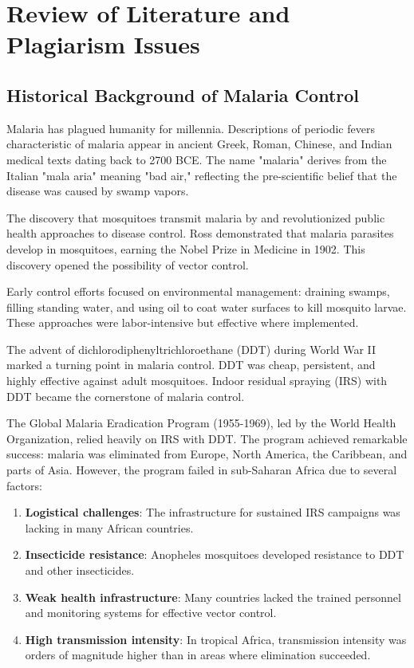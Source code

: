 \chapter{Review of Literature and Plagiarism Issues}

\section{Historical Background of Malaria Control}

Malaria has plagued humanity for millennia. Descriptions of periodic fevers characteristic of malaria appear in ancient Greek, Roman, Chinese, and Indian medical texts dating back to 2700 BCE. The name "malaria" derives from the Italian "mala aria" meaning "bad air," reflecting the pre-scientific belief that the disease was caused by swamp vapors.

The discovery that mosquitoes transmit malaria by \citet{ross1898} and \citet{grassi1900} revolutionized public health approaches to disease control. Ross demonstrated that malaria parasites develop in mosquitoes, earning the Nobel Prize in Medicine in 1902. This discovery opened the possibility of vector control.

Early control efforts focused on environmental management: draining swamps, filling standing water, and using oil to coat water surfaces to kill mosquito larvae. These approaches were labor-intensive but effective where implemented.

The advent of dichlorodiphenyltrichloroethane (DDT) during World War II marked a turning point in malaria control. DDT was cheap, persistent, and highly effective against adult mosquitoes. Indoor residual spraying (IRS) with DDT became the cornerstone of malaria control.

The Global Malaria Eradication Program (1955-1969), led by the World Health Organization, relied heavily on IRS with DDT. The program achieved remarkable success: malaria was eliminated from Europe, North America, the Caribbean, and parts of Asia. However, the program failed in sub-Saharan Africa due to several factors:

\begin{enumerate}
	\item \textbf{Logistical challenges}: The infrastructure for sustained IRS campaigns was lacking in many African countries.
	
	\item \textbf{Insecticide resistance}: Anopheles mosquitoes developed resistance to DDT and other insecticides.
	
	\item \textbf{Weak health infrastructure}: Many countries lacked the trained personnel and monitoring systems for effective vector control.
	
	\item \textbf{High transmission intensity}: In tropical Africa, transmission intensity was orders of magnitude higher than in areas where elimination succeeded.
\end{enumerate}

